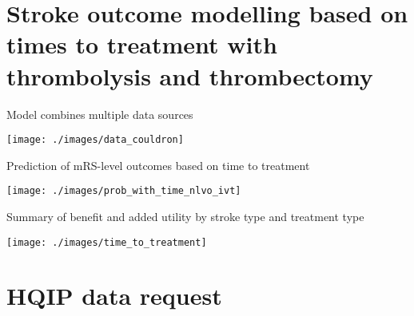 \documentclass[xcolor={usenames,dvipsnames}]{beamer}
\begin{document}

\section{Stroke outcome modelling based on times to treatment with thrombolysis and thrombectomy}




\begin{frame}{Model combines multiple data sources}

\begin{center}
\texttt{[image: ./images/data\_couldron]}
\end{center}
    
\end{frame}


\begin{frame}{Prediction of mRS-level outcomes based on time to treatment}

\begin{center}
\texttt{[image: ./images/prob\_with\_time\_nlvo\_ivt]}
\end{center}
    
\end{frame}


\begin{frame}{Summary of benefit and added utility by stroke type and treatment type}

\begin{center}
\texttt{[image: ./images/time\_to\_treatment]}
\end{center}
    
\end{frame}

\section{HQIP data request}
\end{document}
